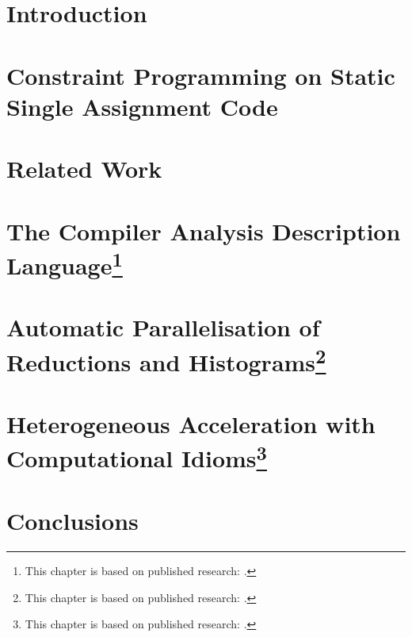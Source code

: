 \documentclass[phd,icsa,twoside,logo,11pt]{infthesis}
\begin{document}
\chapter{Introduction}
    \label{chapter:introduction}
    

\chapter{Constraint Programming on Static Single Assignment Code}
    \label{chapter:theory}
    

\chapter{Related Work}
    \label{chapter:literature}
    

\chapter[The Compiler Analysis Description Language]
        {The Compiler Analysis Description Language\footnote{This
         chapter is based on published research:
         \citet{Ginsbach:2018:CDS:3178372.3179515}.}}
    \label{chapter:candl}
    

\chapter[Automatic Parallelisation of Reductions and Histograms]
        {Automatic Parallelisation of Reductions and Histograms\footnote{This
         chapter is based on published research:
         \citet{ginsbach2017discovery}.}}
    \label{chapter:reductions}
    

\chapter[Heterogeneous Acceleration with Computational Idioms]
        {Heterogeneous Acceleration with Computational Idioms\footnote{This
         chapter is based on published research:
         \citet{Ginsbach:2018:AML:3173162.3173182}.}}
    \label{chapter:idioms}
    

\chapter{Conclusions}
    \label{chapter:conclusion}
    
\end{document}
